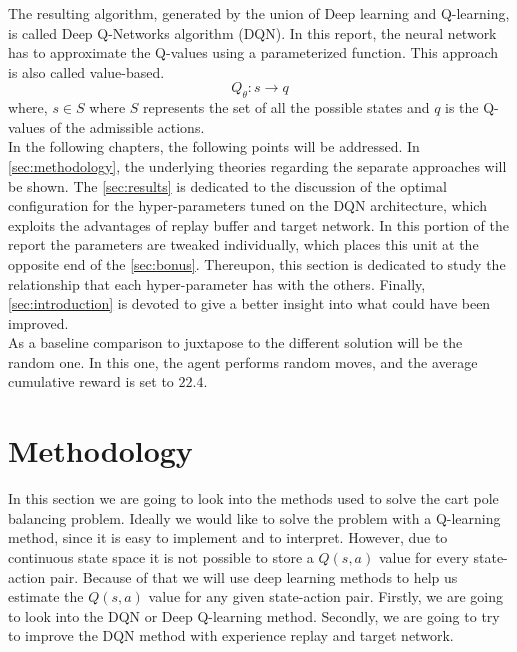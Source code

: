 \documentclass{article}
\begin{document}
The resulting algorithm, generated by the union of Deep learning and Q-learning, is called Deep Q-Networks algorithm (DQN).
In this report, the neural network has to approximate the Q-values using a parameterized function.
This approach is also called value-based.
\begin{equation}
    Q_{\theta} :  s \rightarrow q
    \label{eq:value-based-approach}
\end{equation}
where, $s \in S$ where $S$ represents the set of all the possible states and $q$ is the Q-values of the admissible actions.\\
In the following chapters, the following points will be addressed.
In \autoref{sec:methodology}, the underlying theories regarding the separate approaches will be shown.
The \autoref{sec:results} is dedicated to the discussion of the optimal configuration for the hyper-parameters tuned on the DQN architecture, which exploits the advantages of replay buffer and target network.
In this portion of the report the parameters are tweaked individually, which places this unit at the opposite end of the \autoref{sec:bonus}.
Thereupon, this section is dedicated to study the relationship that each hyper-parameter has with the others.
Finally, \autoref{sec:introduction} is devoted to give a better insight into what could have been improved.\\
As a baseline comparison to juxtapose to the different solution will be the random one.
In this one, the agent performs random moves, and the average cumulative reward is set to $22.4$.

\section{Methodology}
\label{sec:methodology}
In this section we are going to look into the methods used to solve the cart pole balancing problem.
Ideally we would like to solve the problem with a Q-learning method, since it is easy to implement and to interpret.
However, due to continuous state space it is not possible to store a $Q(s,a)$ value for every state-action pair.
Because of that we will use deep learning methods to help us estimate the $Q(s,a)$ value for any given state-action pair.
Firstly, we are going to look into the DQN or Deep Q-learning method.
Secondly, we are going to try to improve the DQN method with experience replay and target network.
\end{document}
